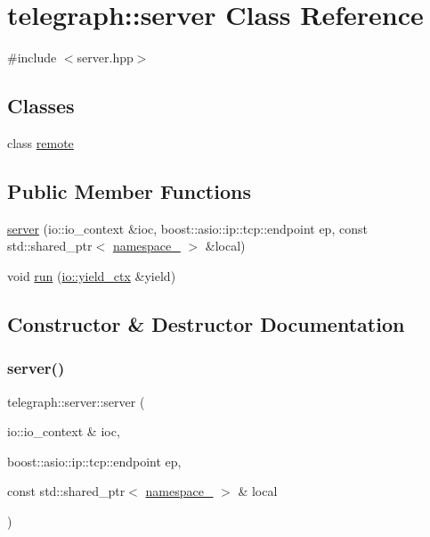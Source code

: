 \hypertarget{classtelegraph_1_1server}{}\section{telegraph\+:\+:server Class Reference}
\label{classtelegraph_1_1server}


{\ttfamily \#include $<$server.\+hpp$>$}

\subsection*{Classes}
\begin{DoxyCompactItemize}
\item 
class \hyperlink{classtelegraph_1_1server_1_1remote}{remote}
\end{DoxyCompactItemize}
\subsection*{Public Member Functions}
\begin{DoxyCompactItemize}
\item 
\hyperlink{classtelegraph_1_1server_ab1016347c0288b33aa5cf38a70928351}{server} (io\+::io\+\_\+context \&ioc, boost\+::asio\+::ip\+::tcp\+::endpoint ep, const std\+::shared\+\_\+ptr$<$ \hyperlink{classtelegraph_1_1namespace__}{namespace\+\_\+} $>$ \&local)
\item 
void \hyperlink{classtelegraph_1_1server_ad7bf15056564c266ea630e35157758bc}{run} (\hyperlink{structboost_1_1asio_1_1yield__ctx}{io\+::yield\+\_\+ctx} \&yield)
\end{DoxyCompactItemize}


\subsection{Constructor \& Destructor Documentation}
\mbox{\label{classtelegraph_1_1server_ab1016347c0288b33aa5cf38a70928351}} 
\subsubsection{\texorpdfstring{server()}{server()}}
{\footnotesize\ttfamily telegraph\+::server\+::server (\begin{DoxyParamCaption}\item[{io\+::io\+\_\+context \&}]{ioc,  }\item[{boost\+::asio\+::ip\+::tcp\+::endpoint}]{ep,  }\item[{const std\+::shared\+\_\+ptr$<$ \hyperlink{classtelegraph_1_1namespace__}{namespace\+\_\+} $>$ \&}]{local }\end{DoxyParamCaption})}



